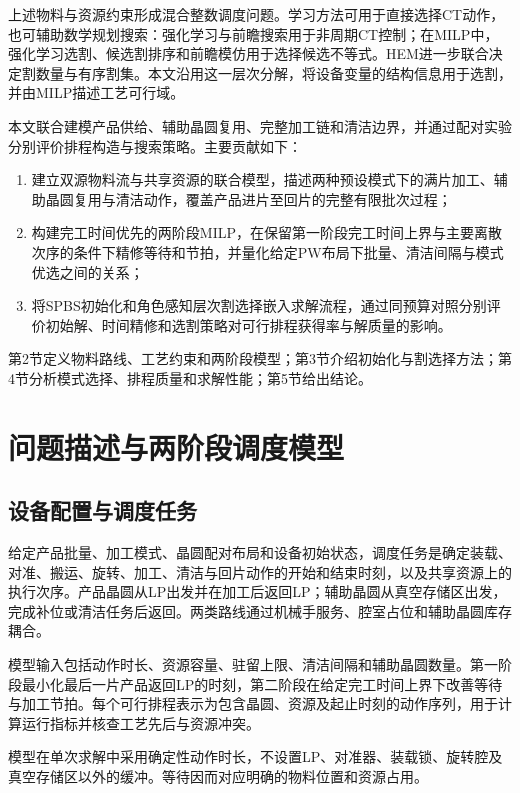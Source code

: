 \documentclass[journal]{IEEEtran}
\begin{document}
上述物料与资源约束形成混合整数调度问题。学习方法可用于直接选择CT动作，也可辅助数学规划搜索：强化学习与前瞻搜索用于非周期CT控制\cite{kim2025adaptivecluster}；在MILP中，强化学习选割、候选割排序和前瞻模仿用于选择候选不等式\cite{tang2020cut,huang2022cutranking,paulus2022looking}。HEM进一步联合决定割数量与有序割集\cite{wang2023hem}。本文沿用这一层次分解，将设备变量的结构信息用于选割，并由MILP描述工艺可行域。

本文联合建模产品供给、辅助晶圆复用、完整加工链和清洁边界，并通过配对实验分别评价排程构造与搜索策略。主要贡献如下：
\begin{enumerate}[leftmargin=*]
\item 建立双源物料流与共享资源的联合模型，描述两种预设模式下的满片加工、辅助晶圆复用与清洁动作，覆盖产品进片至回片的完整有限批次过程；
\item 构建完工时间优先的两阶段MILP，在保留第一阶段完工时间上界与主要离散次序的条件下精修等待和节拍，并量化给定PW布局下批量、清洁间隔与模式优选之间的关系；
\item 将SPBS初始化和角色感知层次割选择嵌入求解流程，通过同预算对照分别评价初始解、时间精修和选割策略对可行排程获得率与解质量的影响。
\end{enumerate}

第2节定义物料路线、工艺约束和两阶段模型；第3节介绍初始化与割选择方法；第4节分析模式选择、排程质量和求解性能；第5节给出结论。

\section{问题描述与两阶段调度模型}


\subsection{设备配置与调度任务}

给定产品批量、加工模式、晶圆配对布局和设备初始状态，调度任务是确定装载、对准、搬运、旋转、加工、清洁与回片动作的开始和结束时刻，以及共享资源上的执行次序。产品晶圆从LP出发并在加工后返回LP；辅助晶圆从真空存储区出发，完成补位或清洁任务后返回。两类路线通过机械手服务、腔室占位和辅助晶圆库存耦合。

模型输入包括动作时长、资源容量、驻留上限、清洁间隔和辅助晶圆数量。第一阶段最小化最后一片产品返回LP的时刻，第二阶段在给定完工时间上界下改善等待与加工节拍。每个可行排程表示为包含晶圆、资源及起止时刻的动作序列，用于计算运行指标并核查工艺先后与资源冲突。

模型在单次求解中采用确定性动作时长，不设置LP、对准器、装载锁、旋转腔及真空存储区以外的缓冲。等待因而对应明确的物料位置和资源占用。
\end{document}
